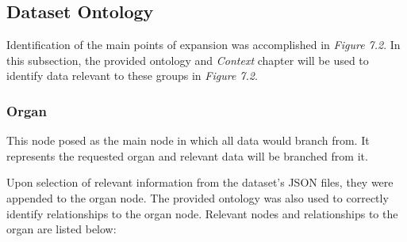 \subsection{Dataset Ontology}
\hspace*{0.5cm} Identification of the main points of expansion was accomplished in \textit{Figure 7.2}. In this subsection, the provided ontology and \textit{Context} chapter will be used to identify data relevant to these groups in \textit{Figure 7.2}.

\subsubsection{Organ}
\hspace*{0.5cm} This node posed as the main node in which all data would branch from. It represents the requested organ and relevant data will be branched from it. 

Upon selection of relevant information from the dataset's JSON files, they were appended to the organ node. The provided ontology was also used to correctly identify relationships to the organ node. Relevant nodes and relationships to the organ are listed below:

